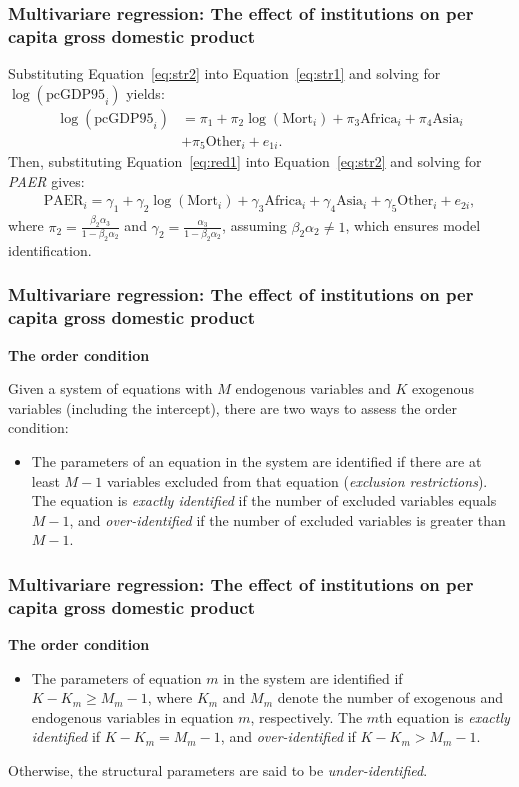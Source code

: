 \documentclass[12pt, compress]{beamer}
\begin{document}
\begin{frame}
	\frametitle{Multivariare regression: The effect of institutions on per capita gross domestic product}
Substituting Equation~\ref{eq:str2} into Equation~\ref{eq:str1} and solving for $\log(\text{pcGDP95}_i)$ yields:
\begin{align}\label{eq:red1}
	\log(\text{pcGDP95}_i) &= \pi_1 + \pi_2 \log(\text{Mort}_i) + \pi_3 \text{Africa}_i + \pi_4 \text{Asia}_i\nonumber\\ 
    &+ \pi_5 \text{Other}_i + e_{1i}.
\end{align}
Then, substituting Equation~\ref{eq:red1} into Equation~\ref{eq:str2} and solving for \textit{PAER} gives:
\begin{align}\label{eq:red2}
	\text{PAER}_i = \gamma_1 + \gamma_2 \log(\text{Mort}_i) + \gamma_3 \text{Africa}_i + \gamma_4 \text{Asia}_i + \gamma_5 \text{Other}_i + e_{2i},
\end{align}
where $\pi_2 = \frac{\beta_2 \alpha_3}{1 - \beta_2 \alpha_2}$ and $\gamma_2 = \frac{\alpha_3}{1 - \beta_2 \alpha_2}$, assuming $\beta_2 \alpha_2 \neq 1$, which ensures model identification.
\end{frame}

\begin{frame}
	\frametitle{Multivariare regression: The effect of institutions on per capita gross domestic product}
\textbf{The order condition}

Given a system of equations with $M$ endogenous variables and $K$ exogenous variables (including the intercept), there are two ways to assess the order condition:
\begin{itemize}
	\item The parameters of an equation in the system are identified if there are at least $M - 1$ variables excluded from that equation (\textit{exclusion restrictions}). The equation is \textit{exactly identified} if the number of excluded variables equals $M - 1$, and \textit{over-identified} if the number of excluded variables is greater than $M - 1$.
\end{itemize}
\end{frame}

\begin{frame}
	\frametitle{Multivariare regression: The effect of institutions on per capita gross domestic product}
\textbf{The order condition}

\begin{itemize}
	\item The parameters of equation $m$ in the system are identified if $K - K_m \geq M_m - 1$, where $K_m$ and $M_m$ denote the number of exogenous and endogenous variables in equation $m$, respectively. The $m$th equation is \textit{exactly identified} if $K - K_m = M_m - 1$, and \textit{over-identified} if $K - K_m > M_m - 1$.
\end{itemize}

Otherwise, the structural parameters are said to be \textit{under-identified}.
\end{frame}
\end{document}

